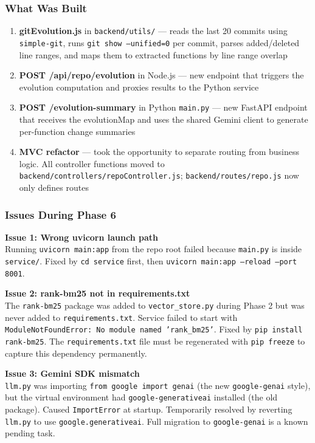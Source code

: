 \documentclass[a4paper,11pt]{article}
\begin{document}
\subsubsection{What Was Built}
\begin{enumerate}
    \item \textbf{gitEvolution.js} in \texttt{backend/utils/} --- reads the last 20 commits using \texttt{simple-git}, runs \texttt{git show --unified=0} per commit, parses added/deleted line ranges, and maps them to extracted functions by line range overlap
    \item \textbf{POST /api/repo/evolution} in Node.js --- new endpoint that triggers the evolution computation and proxies results to the Python service
    \item \textbf{POST /evolution-summary} in Python \texttt{main.py} --- new FastAPI endpoint that receives the evolutionMap and uses the shared Gemini client to generate per-function change summaries
    \item \textbf{MVC refactor} --- took the opportunity to separate routing from business logic. All controller functions moved to \texttt{backend/controllers/repoController.js}; \texttt{backend/routes/repo.js} now only defines routes
\end{enumerate}

\subsubsection{Issues During Phase 6}

\textbf{Issue 1: Wrong uvicorn launch path}\\
Running \texttt{uvicorn main:app} from the repo root failed because \texttt{main.py} is inside \texttt{service/}. Fixed by \texttt{cd service} first, then \texttt{uvicorn main:app --reload --port 8001}.

\vspace{4pt}
\textbf{Issue 2: rank-bm25 not in requirements.txt}\\
The \texttt{rank-bm25} package was added to \texttt{vector\_store.py} during Phase 2 but was never added to \texttt{requirements.txt}. Service failed to start with \texttt{ModuleNotFoundError: No module named 'rank\_bm25'}. Fixed by \texttt{pip install rank-bm25}. The \texttt{requirements.txt} file must be regenerated with \texttt{pip freeze} to capture this dependency permanently.

\vspace{4pt}
\textbf{Issue 3: Gemini SDK mismatch}\\
\texttt{llm.py} was importing \texttt{from google import genai} (the new \texttt{google-genai} style), but the virtual environment had \texttt{google-generativeai} installed (the old package). Caused \texttt{ImportError} at startup. Temporarily resolved by reverting \texttt{llm.py} to use \texttt{google.generativeai}. Full migration to \texttt{google-genai} is a known pending task.
\end{document}
